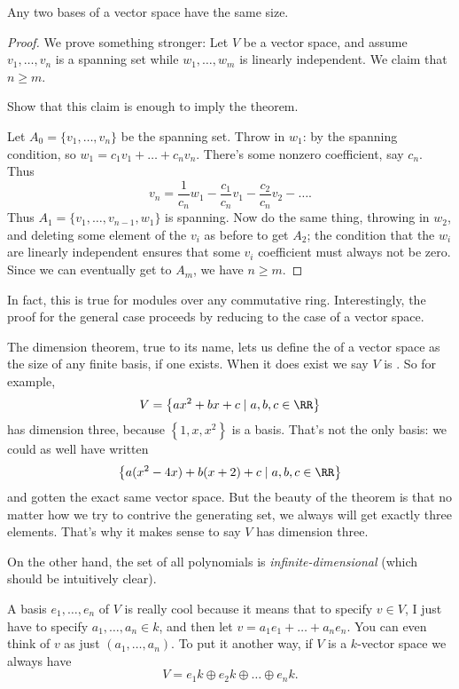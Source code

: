 \begin{theorem}
	Any two bases of a vector space have the same size.
\end{theorem}
\begin{proof}
	We prove something stronger:
	Let $V$ be a vector space, and assume $v_1, \dots, v_n$ is a spanning set
	while $w_1, \dots, w_m$ is linearly independent. We claim that $n \ge m$.
	\begin{ques}
		Show that this claim is enough to imply the theorem.
	\end{ques}

	Let $A_0 = \{v_1, \dots, v_n\}$ be the spanning set.
	Throw in $w_1$: by the spanning condition, so $w_1 = c_1v_1 + \dots + c_nv_n$.
	There's some nonzero coefficient, say $c_n$.
	Thus \[ v_n = \frac{1}{c_n} w_1 - \frac{c_1}{c_n}v_1 - \frac{c_2}{c_n}v_2 - \dots. \]
	Thus $A_1 = \{v_1, \dots, v_{n-1}, w_1\}$ is spanning.
	Now do the same thing, throwing in $w_2$, and deleting some element of the $v_i$ as before to get $A_2$;
	the condition that the $w_i$ are linearly independent ensures that some $v_i$ coefficient
	must always not be zero.
	Since we can eventually get to $A_m$, we have $n \ge m$.
\end{proof}
\begin{remark}
	In fact, this is true for modules over any commutative ring.
	Interestingly, the proof for the general case proceeds by reducing
	to the case of a vector space.
\end{remark}

The dimension theorem, true to its name, lets us define the  of
a vector space as the size of any finite basis, if one exists.
When it does exist we say $V$ is .
So for example,
\[ V = \left\{ ax^2 + bx + c \mid a,b,c \in \RR \right\} \]
has dimension three, because $\left\{ 1,x,x^2 \right\}$ is a basis.
That's not the only basis: we could as well have written
\[ \left\{ a(x^2-4x) + b(x+2) + c \mid a,b,c \in \RR \right\} \]
and gotten the exact same vector space.
But the beauty of the theorem is that no matter how we try
to contrive the generating set, we always will get exactly three elements.
That's why it makes sense to say $V$ has dimension three.

On the other hand, the set of all polynomials is \emph{infinite-dimensional}
(which should be intuitively clear).

A basis $e_1, \dots, e_n$ of $V$ is really cool because it means that to specify $v \in V$, I just have to specify $a_1, \dots, a_n \in k$,
and then let $v = a_1e_1 + \dots + a_ne_n$.
You can even think of $v$ as just $\left( a_1, \dots, a_n \right)$.
To put it another way, if $V$ is a $k$-vector space we always have
\[ V = e_1k \oplus e_2k \oplus \dots \oplus e_nk. \]

